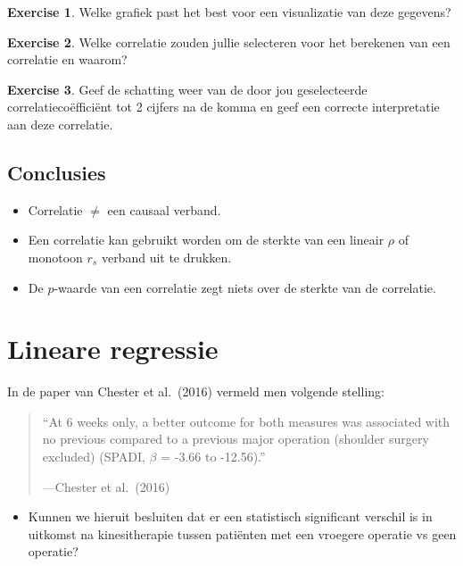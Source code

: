 \documentclass[
]{book}
\providecommand{\tightlist}{%
  \setlength{\itemsep}{0pt}\setlength{\parskip}{0pt}}
\theoremstyle{definition}
\theoremstyle{definition}
\theoremstyle{definition}
\newtheorem{exercise}{Exercise}[chapter]
\theoremstyle{definition}
\theoremstyle{remark}
\begin{document}
\begin{exercise}
Welke grafiek past het best voor een visualizatie van deze gegevens?
\end{exercise}

\begin{exercise}
Welke correlatie zouden jullie selecteren voor het berekenen van een correlatie en waarom?
\end{exercise}

\begin{exercise}
Geef de schatting weer van de door jou geselecteerde correlatiecoëfficiënt tot 2 cijfers na de komma en geef een correcte interpretatie aan deze correlatie.
\end{exercise}

\hypertarget{conclusies}{%
\section*{Conclusies}\label{conclusies}}


\begin{itemize}
\tightlist
\item
  Correlatie \(\neq\) een causaal verband.
\item
  Een correlatie kan gebruikt worden om de sterkte van een lineair \(\rho\) of monotoon \(r_s\) verband uit te drukken.
\item
  De \(p\)-waarde van een correlatie zegt niets over de sterkte van de correlatie.
\end{itemize}

\mainmatter

\hypertarget{regr}{%
\chapter{Lineare regressie}\label{regr}}

In de paper van Chester et al.~(2016) vermeld men volgende stelling:

\begin{quote}
``At 6 weeks only, a better outcome for both measures was associated with no previous compared to a previous major operation (shoulder surgery excluded) (SPADI, \(\beta\) = -3.66 to -12.56).''

---Chester et al.~(2016)
\end{quote}

\begin{itemize}
\tightlist
\item
  Kunnen we hieruit besluiten dat er een statistisch significant verschil is in uitkomst na kinesitherapie tussen patiënten met een vroegere operatie vs geen operatie?
\end{itemize}
\end{document}

